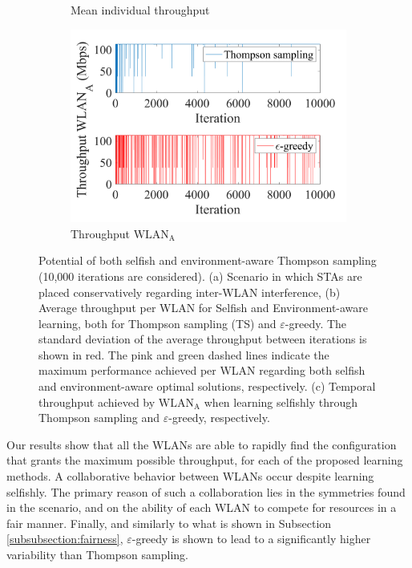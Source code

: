 \documentclass[preprint,12pt]{elsarticle}
\begin{document}
\begin{figure}[h!]
\begin{subfigure}[b]{0.36\textwidth}
		\caption{Mean individual throughput}
		\label{fig:4_grid_selfish_benefits_mean_tpt}
	\end{subfigure}
	\begin{subfigure}[b]{0.36\textwidth}
		\includegraphics[width=\textwidth]{experiment_2_2_variability}
		\caption{Throughput $\text{WLAN}_\text{A}$}
		\label{fig:experiment_2_2_variability}
	\end{subfigure}
	\caption{Potential of both selfish and environment-aware Thompson sampling (10,000 iterations are considered). (a) Scenario in which STAs are placed conservatively regarding inter-WLAN interference, (b) Average throughput per WLAN for Selfish and Environment-aware learning, both for Thompson sampling (TS) and $\varepsilon$-greedy. The standard deviation of the average throughput between iterations is shown in red. The pink and green dashed lines indicate the maximum performance achieved per WLAN regarding both selfish and environment-aware optimal solutions, respectively. (c) Temporal throughput achieved by $\text{WLAN}_\text{A}$ when learning selfishly through Thompson sampling and $\varepsilon$-greedy, respectively.}
	\label{fig:4_grid_selfish_benefits}
\end{figure} 	

Our results show that all the WLANs are able to rapidly find the configuration that grants the maximum possible throughput, for each of the proposed learning methods. A collaborative behavior between WLANs occur despite learning selfishly. The primary reason of such a collaboration lies in the symmetries found in the scenario, and on the ability of each WLAN to compete for resources in a fair manner. Finally, and similarly to what is shown in Subsection \ref{subsubsection:fairness}, $\varepsilon$-greedy is shown to lead to a significantly higher variability than Thompson sampling.
\end{document}
